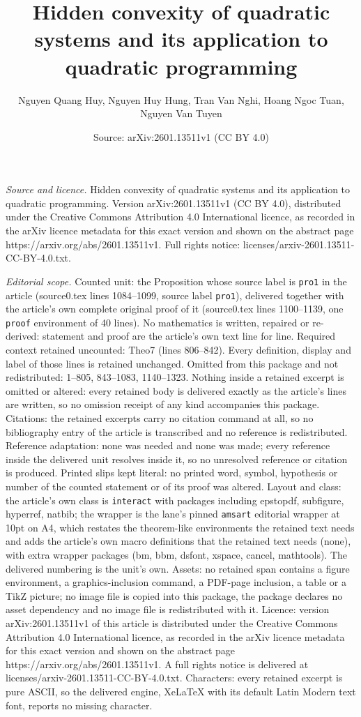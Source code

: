 \documentclass[10pt,a4paper]{amsart}
\title[Hidden convexity of quadratic systems and its application to]{Hidden convexity of quadratic systems and its application to quadratic programming}
\author{Nguyen Quang Huy, Nguyen Huy Hung, Tran Van Nghi, Hoang Ngoc Tuan, Nguyen Van Tuyen}
\date{Source: arXiv:2601.13511v1 (CC BY 4.0)}
\begin{document}
\maketitle

\noindent\emph{Source and licence.} Hidden convexity of quadratic systems and its application to quadratic programming. Version arXiv:2601.13511v1 (CC BY 4.0), distributed under the Creative Commons Attribution 4.0 International licence, as recorded in the arXiv licence metadata for this exact version and shown on the abstract page https://arxiv.org/abs/2601.13511v1. Full rights notice: licenses/arxiv-2601.13511-CC-BY-4.0.txt.\par\smallskip

\noindent\textit{Editorial scope.} Counted unit: the Proposition whose source label is \texttt{pro1} in the article (source0.tex lines 1084--1099, source label \texttt{pro1}), delivered together with the article's own complete original proof of it (source0.tex lines 1100--1139, one \texttt{proof} environment of 40 lines). No mathematics is written, repaired or re-derived: statement and proof are the article's own text line for line. Required context retained uncounted: Theo7 (lines 806--842). Every definition, display and label of those lines is retained unchanged. Omitted from this package and not redistributed: 1--805, 843--1083, 1140--1323. Nothing inside a retained excerpt is omitted or altered: every retained body is delivered exactly as the article's lines are written, so no omission receipt of any kind accompanies this package. Citations: the retained excerpts carry no citation command at all, so no bibliography entry of the article is transcribed and no reference is redistributed. Reference adaptation: none was needed and none was made; every reference inside the delivered unit resolves inside it, so no unresolved reference or citation is produced. Printed slips kept literal: no printed word, symbol, hypothesis or number of the counted statement or of its proof was altered. Layout and class: the article's own class is \texttt{interact} with packages including epstopdf, subfigure, hyperref, natbib; the wrapper is the lane's pinned \texttt{amsart} editorial wrapper at 10pt on A4, which restates the theorem-like environments the retained text needs and adds the article's own macro definitions that the retained text needs (none), with extra wrapper packages (bm, bbm, dsfont, xspace, cancel, mathtools). The delivered numbering is the unit's own. Assets: no retained span contains a figure environment, a graphics-inclusion command, a PDF-page inclusion, a table or a TikZ picture; no image file is copied into this package, the package declares no asset dependency and no image file is redistributed with it. Licence: version arXiv:2601.13511v1 of this article is distributed under the Creative Commons Attribution 4.0 International licence, as recorded in the arXiv licence metadata for this exact version and shown on the abstract page https://arxiv.org/abs/2601.13511v1. A full rights notice is delivered at licenses/arxiv-2601.13511-CC-BY-4.0.txt. Characters: every retained excerpt is pure ASCII, so the delivered engine, XeLaTeX with its default Latin Modern text font, reports no missing character.
\end{document}
